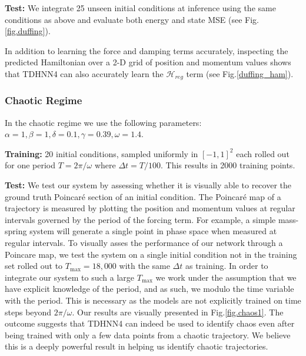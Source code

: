 \documentclass{article}
\begin{document}
\textbf{Test:} We integrate 25 unseen initial conditions at inference using the same conditions as above and evaluate both energy and state MSE (see Fig.\ref{fig.duffing}).

In addition to learning the force and damping terms accurately, inspecting the predicted Hamiltonian over a 2-D grid of position and momentum values shows that TDHNN4 can also accurately learn the $\mathcal{H}_{reg}$ term (see Fig.\ref{duffing_ham}).

\subsubsection{Chaotic Regime}

In the chaotic regime we use the following parameters:
$\alpha =1,\beta=1,\delta=0.1,\gamma=0.39,\omega=1.4$. 

\textbf{Training:} 20 initial conditions, sampled uniformly in $[-1,1]^2$ each rolled out for one period $T=2\pi/\omega$ where $\Delta t = T/100$. This results in 2000 training points.

\textbf{Test:} We test our system by assessing whether it is visually able to recover the ground truth Poincar\'e section of an initial condition. The Poincar\'e map of a trajectory is measured by plotting the position and momentum values at regular intervals governed by the period of the forcing term. For example, a simple mass-spring system will generate a single point in phase space when measured at regular intervals. To visually asses the performance of our network through a Poincare map, we test the system on a single initial condition not in the training set rolled out to $T_{\max} = 18,000$ with the same $\Delta t$ as training. In order to integrate our system to such a large $T_{\max}$ we work under the assumption that we have explicit knowledge of the period, and as such, we modulo the time variable with the period. This is necessary as the models are not explicitly trained on time steps beyond $2\pi/\omega$. Our results are visually presented in Fig.\ref{fig.chaos1}. The outcome suggests that TDHNN4 can indeed be used to identify chaos even after being trained with only a few data points from a chaotic trajectory. We believe this is a deeply powerful result in helping us identify chaotic trajectories.
\end{document}
